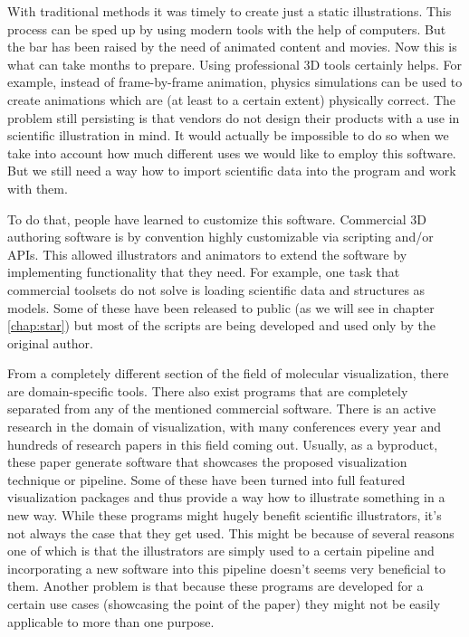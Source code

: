 \documentclass[
  digital, %
  table,   %
  nolof,     %
  nolot,     %
]{fithesis3}
\begin{document}
With traditional methods it was timely to create just a static illustrations. This process can be sped up by using modern tools with the help of computers. But the bar has been raised by the need of animated content and movies. Now this is what can take months to prepare. Using professional 3D tools certainly helps. For example, instead of frame-by-frame animation, physics simulations can be used to create animations which are (at least to a certain extent) physically correct. The problem still persisting is that vendors do not design their products with a use in scientific illustration in mind. It would actually be impossible to do so when we take into account how much different uses we would like to employ this software. But we still need a way how to import scientific data into the program and work with them.

To do that, people have learned to customize this software\cite{GrahamGaelInterview}. Commercial 3D authoring software is by convention highly customizable via scripting and/or APIs. This allowed illustrators and animators to extend the software by implementing functionality that they need. For example, one task that commercial toolsets do not solve is loading scientific data and structures as models. Some of these have been released to public (as we will see in chapter \ref{chap:star}) but most of the scripts are being developed and used only by the original author.

From a completely different section of the field of molecular visualization, there are domain-specific tools.
There also exist programs that are completely separated from any of the mentioned commercial software. There is an active research in the domain of visualization, with many conferences every year and hundreds of research papers in this field coming out. Usually, as a byproduct, these paper generate software that showcases the proposed visualization technique or pipeline. Some of these have been turned into full featured visualization packages and thus provide a way how to illustrate something in a new way. While these programs might hugely benefit scientific illustrators, it's not always the case that they get used. This might be because of several reasons one of which is that the illustrators are simply used to a certain pipeline and incorporating a new software into this pipeline doesn't seems very beneficial to them. Another problem is that because these programs are developed for a certain use cases (showcasing the point of the paper) they might not be easily applicable to more than one purpose.
\end{document}
